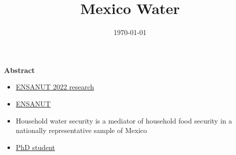 \documentclass [11pt]{article}
\begin{document}
\title{Mexico Water%
}

\author{
}
\date{\today}
\maketitle  

\newcommand{\ToTSample}{59,633}


\begin{center}
\textbf{Abstract}
\end{center}  

\begin{itemize}
\item \href{https://www.saludpublica.mx/index.php/spm/article/view/14798/12417}{ENSANUT 2022 research}
\item \href{https://ensanut.insp.mx/encuestas/ensanutcontinua2023/index.php}{ENSANUT}
\item Household water security is a mediator of household food security in a nationally representative sample of Mexico
\item \href{chrome-extension://efaidnbmnnnibpcajpcglclefindmkaj/https://editorialexpress.com/cgi-bin/conference/download.cgi?db_name=TuftsNEUDC2025&paper_id=383}{PhD student}
\end{itemize}
\end{document}
